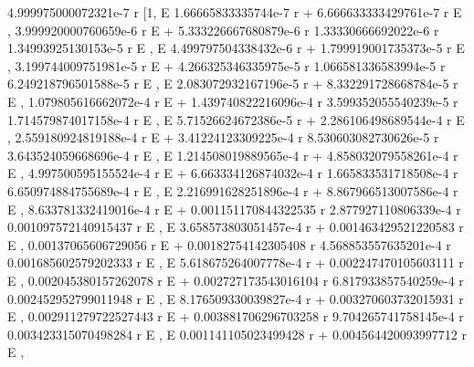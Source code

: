 \documentclass{article}
\begin{document}
    
                 4.999975000072321e-7 r
            [1, E
                               1.66665833335744e-7 r
     + 6.666633333429761e-7 r E                     , 
     3.999920000760659e-6 r
    E                       + 5.333226667680879e-6 r
      1.33330666692022e-6 r   1.34993925130153e-5 r
     E                     , E
                               4.499797504338432e-6 r
     + 1.799919001735373e-5 r E                      , 
     3.199744009751981e-5 r
    E                       + 4.266325346335975e-5 r
      1.066581336583994e-5 r   6.249218796501588e-5 r
     E                      , E
                               2.083072932167196e-5 r
     + 8.332291728668784e-5 r E                      , 
     1.079805616662072e-4 r
    E                       + 1.439740822216096e-4 r
      3.599352055540239e-5 r   1.714579874017158e-4 r
     E                      , E
                               5.71526624672386e-5 r
     + 2.286106498689544e-4 r E                     , 
     2.559180924819188e-4 r
    E                       + 3.41224123309225e-4 r
      8.530603082730626e-5 r   3.643524059668696e-4 r
     E                      , E
                               1.214508019889565e-4 r
     + 4.858032079558261e-4 r E                      , 
     4.997500595155524e-4 r
    E                       + 6.663334126874032e-4 r
      1.665833531718508e-4 r   6.650974884755689e-4 r
     E                      , E
                               2.216991628251896e-4 r
     + 8.867966513007586e-4 r E                      , 
     8.633781332419016e-4 r
    E                       + 0.001151170844322535 r
      2.877927110806339e-4 r   0.001097572140915437 r
     E                      , E
                               3.658573803051457e-4 r
     + 0.001463429521220583 r E                      , 
     0.00137065606729056 r
    E                      + 0.00182754142305408 r
      4.568853557635201e-4 r   0.001685602579202333 r
     E                      , E
                               5.618675264007778e-4 r
     + 0.002247470105603111 r E                      , 
     0.002045380157262078 r
    E                       + 0.002727173543016104 r
      6.817933857540259e-4 r   0.002452952799011948 r
     E                      , E
                               8.176509330039827e-4 r
     + 0.003270603732015931 r E                      , 
     0.002911279722527443 r
    E                       + 0.003881706296703258 r
      9.704265741758145e-4 r   0.003423315070498284 r
     E                      , E
                               0.001141105023499428 r
     + 0.004564420093997712 r E                      , 
\end{document}
